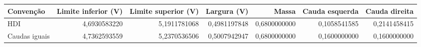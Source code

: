 \begin{tabular}{lrrrrrr}
\toprule
Convenção & Limite inferior (V) & Limite superior (V) & Largura (V) & Massa & Cauda esquerda & Cauda direita \\
\midrule
HDI & 4,6930583220 & 5,1911781068 & 0,4981197848 & 0,6800000000 & 0,1058541585 & 0,2141458415 \\
Caudas iguais & 4,7362593559 & 5,2370536506 & 0,5007942947 & 0,6800000000 & 0,1600000000 & 0,1600000000 \\
\bottomrule
\end{tabular}
